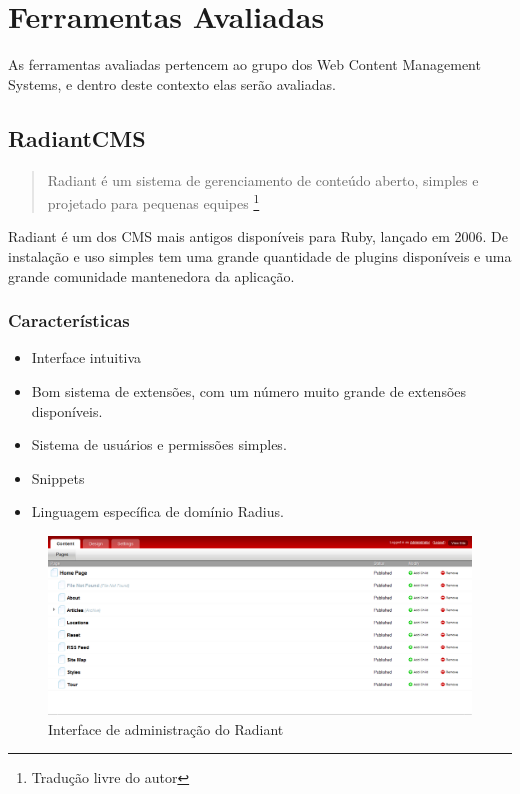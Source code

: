 \chapter{Ferramentas Avaliadas}

As ferramentas avaliadas pertencem ao grupo dos Web Content Management Systems, e dentro deste contexto elas serão avaliadas.

\section{RadiantCMS}

\begin{quote}
Radiant é um sistema de gerenciamento de conteúdo aberto, simples e projetado para pequenas equipes
\cite{radiant_website}\footnote{Tradução livre do autor}
\end{quote}

Radiant é um dos CMS mais antigos disponíveis para Ruby, lançado em 2006. De instalação e uso simples tem uma grande quantidade de plugins disponíveis e uma grande comunidade mantenedora da aplicação.

\subsection{Características}

\begin{itemize}
  \item Interface intuitiva
  \item Bom sistema de extensões, com um número muito grande de extensões disponíveis.
  \item Sistema de usuários e permissões simples.
  \item Snippets
  \item Linguagem específica de domínio Radius.
\end{itemize}

\begin{figure}[here]
\includegraphics[width=150mm]{images/radiant_admin.png}
\caption{Interface de administração do Radiant}
\label{fig:radiant_admin.png}
\end{figure}


